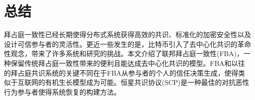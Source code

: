 \section{总结}\label{sec:summary}

拜占庭一致性已经长期使得分布式系统获得高效的共识、标准化的加密安全性以及设计可信参与者的灵活性。更近一些发生的是，比特币引入了去中心化共识的革命性观念，带来了许多系统和研究的挑战。本文介绍了联邦拜占庭一致性(FBA)，一种保留传统拜占庭一致性带来的便利且能达成去中心化共识的模型。FBA和以往的拜占庭共识系统的关键不同在于FBA从参与者的个人的信任决策生成{\quorum}，使得类似于互联网的有机生长模型成为可能。恒星共识协议(SCP)是一种最佳的对抗恶性行为参与者使得系统恢复的构建方法。
